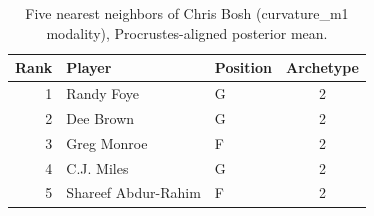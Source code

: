 \begin{table}[htbp]
  \centering\small
  \begin{tabular}{rllc}
    \toprule
    Rank & Player & Position & Archetype \\
    \midrule
    1 & Randy Foye & G & 2 \\
    2 & Dee Brown & G & 2 \\
    3 & Greg Monroe & F & 2 \\
    4 & C.J. Miles & G & 2 \\
    5 & Shareef Abdur-Rahim & F & 2 \\
    \bottomrule
  \end{tabular}
  \caption{Five nearest neighbors of Chris Bosh (curvature_m1 modality), Procrustes-aligned posterior mean.}
  \label{tab:Chris_Bosh_neighbors_curvature_m1}
\end{table}


